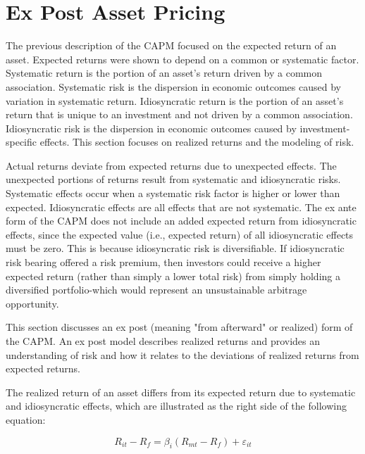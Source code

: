 \documentclass[11pt]{article}
\begin{document}
\section*{Ex Post Asset Pricing}
The previous description of the CAPM focused on the expected return of an asset. Expected returns were shown to depend on a common or systematic factor. Systematic return is the portion of an asset's return driven by a common association. Systematic risk is the dispersion in economic outcomes caused by variation in systematic return. Idiosyncratic return is the portion of an asset's return that is unique to an investment and not driven by a common association. Idiosyncratic risk is the dispersion in economic outcomes caused by investment-specific effects. This section focuses on realized returns and the modeling of risk.

Actual returns deviate from expected returns due to unexpected effects. The unexpected portions of returns result from systematic and idiosyncratic risks. Systematic effects occur when a systematic risk factor is higher or lower than expected. Idiosyncratic effects are all effects that are not systematic. The ex ante form of the CAPM does not include an added expected return from idiosyncratic effects, since the expected value (i.e., expected return) of all idiosyncratic effects must be zero. This is because idiosyncratic risk is diversifiable. If idiosyncratic risk bearing offered a risk premium, then investors could receive a higher expected return (rather than simply a lower total risk) from simply holding a diversified portfolio-which would represent an unsustainable arbitrage opportunity.

This section discusses an ex post (meaning "from afterward" or realized) form of the CAPM. An ex post model describes realized returns and provides an understanding of risk and how it relates to the deviations of realized returns from expected returns.

The realized return of an asset differs from its expected return due to systematic and idiosyncratic effects, which are illustrated as the right side of the following equation:


\begin{equation*}
R_{i t}-R_{f}=\beta_{i}\left(R_{m t}-R_{f}\right)+\varepsilon_{i t} \tag{3}
\end{equation*}
\end{document}
